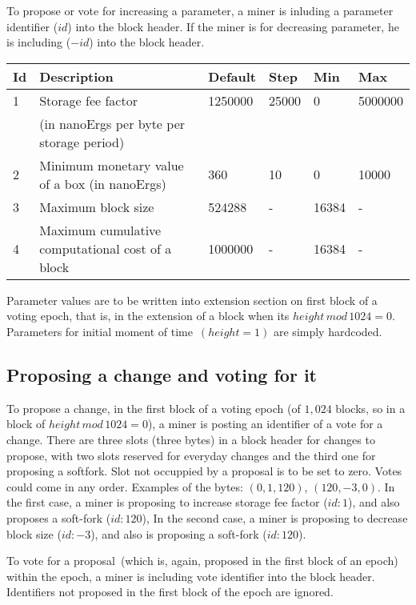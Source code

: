 To propose or vote for increasing a parameter, a miner is inluding a parameter identifier ($id$) into the block header.
If the miner is for decreasing parameter, he is including ($-id$) into the block header.

\begin{tabular}{| l | l | l | l | l | l |}
\hline
Id & Description & Default & Step & Min & Max \\
\hline
\hline
1 & Storage fee factor  & 1250000 & 25000 & 0 & 5000000 \\
  &  (in nanoErgs per byte per storage period) & & & & \\
\hline
2 & Minimum monetary value of a box (in nanoErgs) & 360 & 10 & 0 & 10000 \\
\hline
3 & Maximum block size & 524288 & - & 16384 & - \\
\hline
4 & Maximum cumulative computational cost of a block & 1000000 & - & 16384 & - \\
\hline
\end{tabular}

Parameter values are to be written into extension section on first block of a voting epoch,
that is, in the extension of a block when its $height\,mod\,1024 = 0$.
Parameters for initial moment of time~$(height = 1)$ are simply hardcoded.

\subsection{Proposing a change and voting for it}

To propose a change, in the first block of a voting epoch (of $1,024$ blocks, so in a block of
$height\,mod\,1024 = 0$), a miner is posting an identifier of a vote for a change. There are three slots (three bytes)
in a block header for changes to propose, with two slots reserved for everyday changes and the third one for
proposing a softfork. Slot not occuppied by a proposal is to be set to zero. Votes could come in any order.
Examples of the bytes: $(0, 1, 120)$, $(120, -3, 0)$. In the first case, a miner is proposing to increase storage fee factor ($id:1$), and
also proposes a soft-fork ($id:120$), In the second case, a miner is proposing to decrease block size ($id:-3$), and also
 is proposing a soft-fork ($id:120$).

To vote for a proposal~(which is, again, proposed in the first block of an epoch) within the epoch, a miner is including vote identifier
into the block header. Identifiers not proposed in the first block of the epoch are ignored.

